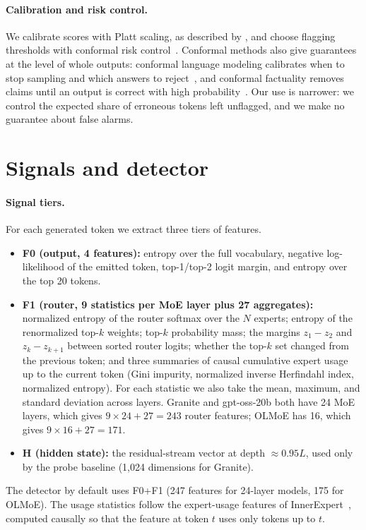 \documentclass[11pt]{article}
\newcommand{\FZ}{\textsf{F0}}
\newcommand{\FO}{\textsf{F1}}
\newcommand{\FZO}{\textsf{F0+F1}}
\newcommand{\Hs}{\textsf{H}}
\begin{document}
\paragraph{Calibration and risk control.}
We calibrate scores with Platt scaling, as described by \citet{guo2017calibration}, and choose flagging thresholds with conformal risk control~\citep{angelopoulos2024conformal}.
Conformal methods also give guarantees at the level of whole outputs: conformal language modeling calibrates when to stop sampling and which answers to reject~\citep{quach2024conformal}, and conformal factuality removes claims until an output is correct with high probability~\citep{mohri2024language}.
Our use is narrower: we control the expected share of erroneous tokens left unflagged, and we make no guarantee about false alarms.

\section{Signals and detector}
\label{sec:method}

\paragraph{Signal tiers.}
For each generated token we extract three tiers of features.
\begin{itemize}
  \item \textbf{\FZ{} (output, 4 features):} entropy over the full vocabulary, negative log-likelihood of the emitted token, top-1/top-2 logit margin, and entropy over the top 20 tokens.
  \item \textbf{\FO{} (router, 9 statistics per MoE layer plus 27 aggregates):} normalized entropy of the router softmax over the $N$ experts; entropy of the renormalized top-$k$ weights; top-$k$ probability mass; the margins $z_1-z_2$ and $z_k-z_{k+1}$ between sorted router logits; whether the top-$k$ set changed from the previous token; and three summaries of causal cumulative expert usage up to the current token (Gini impurity, normalized inverse Herfindahl index, normalized entropy). For each statistic we also take the mean, maximum, and standard deviation across layers. Granite and gpt-oss-20b both have 24 MoE layers, which gives $9\times24+27=243$ router features; OLMoE has 16, which gives $9\times16+27=171$.
  \item \textbf{\Hs{} (hidden state):} the residual-stream vector at depth $\approx0.95L$, used only by the probe baseline (1,024 dimensions for Granite).
\end{itemize}
The detector by default uses \FZO{} (247 features for 24-layer models, 175 for OLMoE).
The usage statistics follow the expert-usage features of InnerExpert~\citep{fonseca2026innerexpert}, computed causally so that the feature at token $t$ uses only tokens up to $t$.
\end{document}
